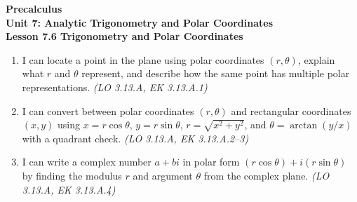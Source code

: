 \documentclass[10pt]{article}
\begin{document}
\vspace{-0.8in}

\begin{center}
  {\color{white}\textbf{\LARGE Precalculus}}\\[4pt]
  {\color{skymid}\large\textbf{Unit 7: Analytic Trigonometry and Polar Coordinates}}\\[6pt]
  {\color{white}\textbf{\large Lesson 7.6 \quad Trigonometry and Polar Coordinates}}
\end{center}

\vspace{0.22in}
\namedateperiod
\vspace{0.18in}

\begin{learningtargetbox}
\small
\begin{enumerate}[leftmargin=1.5em, itemsep=5pt]
  \item I can locate a point in the plane using polar coordinates $(r,\theta)$,
    explain what $r$ and $\theta$ represent, and describe how the same point has
    multiple polar representations. \hfill\textit{(LO 3.13.A, EK 3.13.A.1)}
  \item I can convert between polar coordinates $(r,\theta)$ and rectangular
    coordinates $(x,y)$ using $x = r\cos\theta$, $y = r\sin\theta$,
    $r = \sqrt{x^2+y^2}$, and $\theta = \arctan(y/x)$ with a quadrant check.
    \hfill\textit{(LO 3.13.A, EK 3.13.A.2--3)}
  \item I can write a complex number $a+bi$ in polar form $(r\cos\theta)+i(r\sin\theta)$
    by finding the modulus $r$ and argument $\theta$ from the complex plane.
    \hfill\textit{(LO 3.13.A, EK 3.13.A.4)}
\end{enumerate}
\end{learningtargetbox}

\vspace{0.14in}
\end{document}
